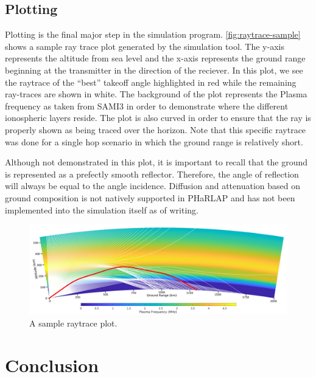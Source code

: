 \documentclass[12pt,letterpaper]{article}
\begin{document}
\subsection{Plotting}
\label{sec:design:plotting}

Plotting is the final major step in the simulation
program. \autoref{fig:raytrace-sample} shows a sample ray trace plot generated
by the simulation tool. The y-axis represents the altitude from sea level and
the x-axis represents the ground range beginning at the transmitter in the
direction of the reciever. In this plot, we see the raytrace of the ``best''
takeoff angle highlighted in red while the remaining ray-traces are shown in
white. The background of the plot represents the Plasma frequency as taken from
SAMI3 in order to demonstrate where the different ionospheric layers reside. The
plot is also curved in order to ensure that the ray is properly shown as being
traced over the horizon. Note that this specific raytrace was done for a single
hop scenario in which the ground range is relatively short.

Although not demonstrated in this plot, it is important to recall that the
ground is represented as a prefectly smooth reflector. Therefore, the angle of
reflection will always be equal to the angle incidence. Diffusion and
attenuation based on ground composition is not natively supported in PHaRLAP and
has not been implemented into the simulation itself as of writing.

\begin{figure}
  \centering

  \includegraphics[width=\linewidth]{raytrace-sample}

  \caption{A sample raytrace plot.}
  \label{fig:raytrace-sample}
\end{figure}

%
%
\section{Conclusion}
\label{sec:conclusion}
\end{document}

